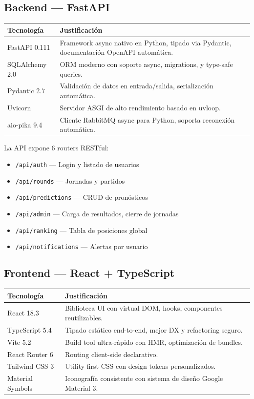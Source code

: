 \documentclass[12pt,a4paper]{article}
\newcommand{\code}[1]{\texttt{\small\color{navy}#1}}
\begin{document}
\subsection{Backend — FastAPI}

\begin{tabularx}{\linewidth}{@{}lX@{}}
  \toprule
  \textbf{Tecnología} & \textbf{Justificación} \\
  \midrule
  FastAPI 0.111   & Framework async nativo en Python, tipado via Pydantic, documentación OpenAPI automática. \\
  SQLAlchemy 2.0  & ORM moderno con soporte async, migrations, y type-safe queries. \\
  Pydantic 2.7    & Validación de datos en entrada/salida, serialización automática. \\
  Uvicorn         & Servidor ASGI de alto rendimiento basado en uvloop. \\
  aio-pika 9.4    & Cliente RabbitMQ async para Python, soporta reconexión automática. \\
  \bottomrule
\end{tabularx}

\vspace{0.5cm}

La API expone 6 routers RESTful:

\begin{itemize}
  \item \code{/api/auth} — Login y listado de usuarios
  \item \code{/api/rounds} — Jornadas y partidos
  \item \code{/api/predictions} — CRUD de pronósticos
  \item \code{/api/admin} — Carga de resultados, cierre de jornadas
  \item \code{/api/ranking} — Tabla de posiciones global
  \item \code{/api/notifications} — Alertas por usuario
\end{itemize}

\subsection{Frontend — React + TypeScript}

\begin{tabularx}{\linewidth}{@{}lX@{}}
  \toprule
  \textbf{Tecnología} & \textbf{Justificación} \\
  \midrule
  React 18.3       & Biblioteca UI con virtual DOM, hooks, componentes reutilizables. \\
  TypeScript 5.4   & Tipado estático end-to-end, mejor DX y refactoring seguro. \\
  Vite 5.2         & Build tool ultra-rápido con HMR, optimización de bundles. \\
  React Router 6   & Routing client-side declarativo. \\
  Tailwind CSS 3   & Utility-first CSS con design tokens personalizados. \\
  Material Symbols & Iconografía consistente con sistema de diseño Google Material 3. \\
  \bottomrule
\end{tabularx}
\end{document}
